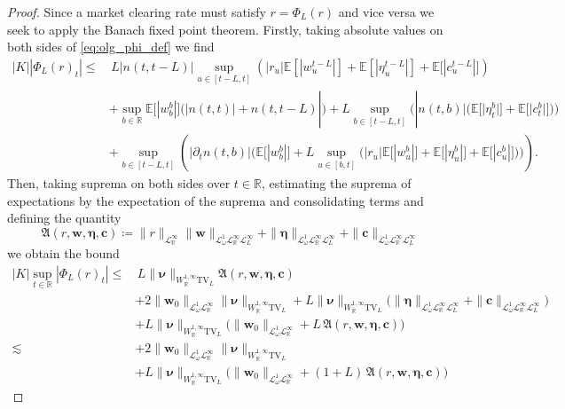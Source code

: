 \documentclass[11pt,oneside,english,reqno,dvipsnames,table]{amsart}
\numberwithin{equation}{section}
\theoremstyle{plain}
\theoremstyle{definition}
\theoremstyle{remark}
\theoremstyle{plain}
\theoremstyle{plain}
\theoremstyle{plain}
\theoremstyle{plain}
\theoremstyle{plain}
\theoremstyle{plain}
\theoremstyle{plain}
\newcommand{\TV}{\text{TV}}
\newcommand{\bc}{\mathbf{c}}
\newcommand{\bw}{\mathbf{w}}
\newcommand{\mbE}{\mathbb{E}}
\newcommand{\mbR}{\mathbb{R}}
\newcommand{\mfA}{\mathfrak{A}}
\newcommand{\msL}{\mathscr{L}}
\newcommand{\bmeta}{\boldsymbol{\eta}}
\newcommand{\bnu}{\boldsymbol{\nu}}
\numberwithin{thm}{section}
\begin{document}
\begin{proof}
Since a market clearing rate must satisfy $r = \Phi_L(r)$ and vice versa we seek to apply the Banach fixed point theorem. Firstly, taking absolute values on both sides of \eqref{eq:olg_phi_def} we find
%
  \begin{equation*}
	\begin{aligned}
	|K||\Phi_L(r)_t| \leq &\, L|n(t,t-L)|\sup_{u\in [t-L,t]}\left( |r_u| \mbE\left[|w^{t-L}_u |\right] +  \mbE\left[|\eta^{t-L}_u|\right]  + \mbE\big[|c^{t-L}_u |\big]\right) \\
		&+ \sup_{b\in \mbR}\mbE\big[|w^b_b|\big] \Big(|n(t,t)|+n(t,t-L)|\Big) +  L \sup_{b\in [t-L,t]} \Big(|n(t,b)|\big(\mbE\big[|\eta^b_t|\big] +  \mbE\big[|c^b_t |\big]\big)\Big) \\
		&+ \sup_{b\in [t-L,t]}\left(|\partial_t n (t,b)| \Big(\mbE\big[|w^b_b|\big] + L \sup_{u\in [b,t]}\big( |r_u| \mbE\big[|w^b_u|\big] + \mbE\big[|\eta^b_u|\big] + \mbE\big[|c^b_u|\big]\big)\Big)\right).
	\end{aligned}
	\end{equation*}
%
Then, taking suprema on both sides over $t\in \mbR$, estimating the suprema of expectations by the expectation of the suprema and consolidating terms and defining the quantity
%
\begin{equation*}
    \mfA(r,\bw,\bmeta,\bc) \coloneqq \|r\|_{\msL^\infty_\mbR}   \|\bw\|_{\msL^1_\omega \msL^\infty_{\mbR}\msL^\infty_L } +  \|\bmeta\|_{ \msL^1_\omega \msL^\infty_{\mbR}\msL^\infty_L}  + \|\bc\|_{\msL^1_\omega \msL^\infty_{\mbR}\msL^\infty_L }
\end{equation*}
%
we obtain the bound
%
 \begin{equation*}
	\begin{aligned}
		|K|\sup_{t\in \mbR}|\Phi_L(r)_t| \leq &\, L\|\bnu\|_{W^{1,\infty}_{\mbR}\TV_L} \mfA(r,\bw,\bmeta,\bc) \\
		&+ 2\|\bw_0\|_{\msL^1_\omega \msL^\infty_\mbR}\|\bnu\|_{W^{1,\infty}_{\mbR}\TV_L} +  L \|\bnu\|_{W^{1,\infty}_{\mbR} \TV_L}\Big(\|\bmeta\|_{ \msL^1_\omega \msL^\infty_{\mbR}\msL^\infty_L}  + \|\bc\|_{\msL^1_\omega \msL^\infty_{\mbR}\msL^\infty_L }\Big) \\
		&+ L \|\bnu\|_{W^{1,\infty}_{\mbR}\TV_L} \Big(\|\bw_0\|_{\msL^1_\omega \msL^\infty_\mbR}+  L \, \mfA(r,\bw,\bmeta,\bc)\Big)\\
		\lesssim \, &+ 2\|\bw_0\|_{\msL^1_\omega \msL^\infty_\mbR}\|\bnu\|_{W^{1,\infty}_{\mbR}\TV_L} \\
		& + L \|\bnu\|_{W^{1,\infty}_{\mbR}\TV_L} \Big(\|\bw_0\|_{\msL^1_\omega \msL^\infty_\mbR}+  (1+L)\,  \mfA(r,\bw,\bmeta,\bc)\Big)
	\end{aligned}
\end{equation*}


\end{proof}
\end{document}
